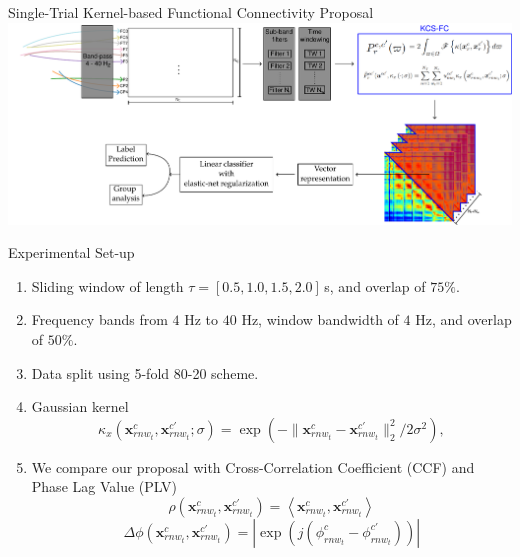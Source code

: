 \documentclass[aspectratio=169]{beamer}
\begin{document}
\begin{frame}{Single-Trial Kernel-based Functional Connectivity Proposal}
    \includegraphics[scale=0.5]{../Tesis_document/Figures/outline_and_contributions/contribution1_C.pdf}
\end{frame}

\begin{frame}{Experimental Set-up}
    \begin{enumerate}
        \item Sliding window of length $\tau=[0.5,1.0,1.5,2.0]$\,{s}, and overlap of $75\%$.
        \item Frequency bands from $4$ Hz to $40$ Hz, window bandwidth of $4$ Hz, and overlap of $50\%$.
        \item Data split using 5-fold 80-20 scheme.
        \item Gaussian kernel
        \[
        \kappa_x\left(\mathbf{x}^{c}_{rnw_t}, \mathbf{x}^{c'}_{rnw_t};\sigma\right) = \exp{\left( {-\|\mathbf{x}^{c}_{rnw_t}-\mathbf{x}^{c'}_{rnw_t}\|^2_2}/{2\sigma^2}\right)},
        \]
        \item We compare our proposal with {Cross-Correlation Coefficient} (CCF) and {Phase Lag Value} (PLV)
        \[
        \rho(\mathbf{x}^{c}_{rnw_t},\mathbf{x}^{c'}_{rnw_t}) ={\left<\mathbf{x}^{c}_{rnw_t},\mathbf{x}^{c'}_{rnw_t}\right>}
        \]
        \[
        \Delta\phi(\mathbf{x}^{c}_{rnw_t},\mathbf{x}^{c'}_{rnw_t}) = {|\exp(j(\phi_{rnw_t}^{c}-\phi_{rnw_t}^{c'}))|}
        \]
    \end{enumerate}
\end{frame}
\end{document}
